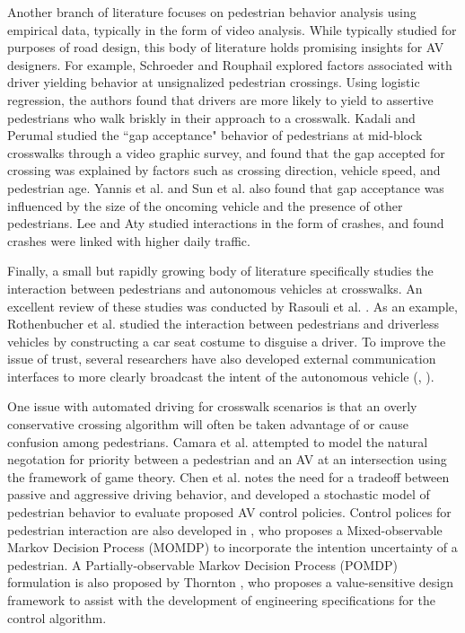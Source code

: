\documentclass[letterpaper, 10 pt, conference]{ieeeconf}  %
\begin{document}
Another branch of literature focuses on pedestrian behavior analysis using empirical data, typically in the form of video analysis. While typically studied for purposes of road design, this body of literature holds promising insights for AV designers. For example, Schroeder and Rouphail \cite{Schroeder2011} explored factors associated with driver yielding behavior at unsignalized pedestrian crossings. Using logistic regression, the authors found that drivers are more likely to yield to assertive pedestrians who walk briskly in their approach to a crosswalk. Kadali and Perumal \cite{RaghuramKadali2012} studied the ``gap acceptance" behavior of pedestrians at mid-block crosswalks through a video graphic survey, and found that the gap accepted for crossing was explained by factors such as crossing direction, vehicle speed, and pedestrian age. Yannis et al. \cite{Yannis2013} and Sun et al.\cite{Sun2002} also found that gap acceptance was influenced by the size of the oncoming vehicle and the presence of other pedestrians.  Lee and Aty \cite{Lee2005} studied interactions in the form of crashes, and found crashes were linked with higher daily traffic. 

Finally, a small but rapidly growing body of literature specifically studies the interaction between pedestrians and autonomous vehicles at crosswalks. An excellent review of these studies was conducted by Rasouli et al. \cite{Rasouli}. As an example, Rothenbucher et al. \cite{Rothenbucher2016} studied the interaction between pedestrians and driverless vehicles by constructing a car seat costume to disguise a driver. To improve the issue of trust, several researchers have also developed external communication interfaces to more clearly broadcast the intent of the autonomous vehicle (\cite{Matthews}, \cite{Lagstrom2015}). 

One issue with automated driving for crosswalk scenarios is that an overly conservative crossing algorithm will often be taken advantage of or cause confusion among pedestrians\cite{Camara2018}. Camara et al. \cite{Camara2018} attempted to model the natural negotation for priority between a pedestrian and an AV at an intersection using the framework of game theory. Chen et al. \cite{Chen} notes the need for a tradeoff between passive and aggressive driving behavior, and developed a stochastic model of pedestrian behavior to evaluate proposed AV control policies. Control polices for pedestrian interaction are also developed in \cite{Bandyopadhyay}, who proposes a Mixed-observable Markov Decision Process (MOMDP) to incorporate the intention uncertainty of a pedestrian. A Partially-observable Markov Decision Process (POMDP) formulation is also proposed by Thornton \cite{Thornton2018}, who proposes a value-sensitive design framework to assist with the development of engineering specifications for the control algorithm. 
\end{document}
